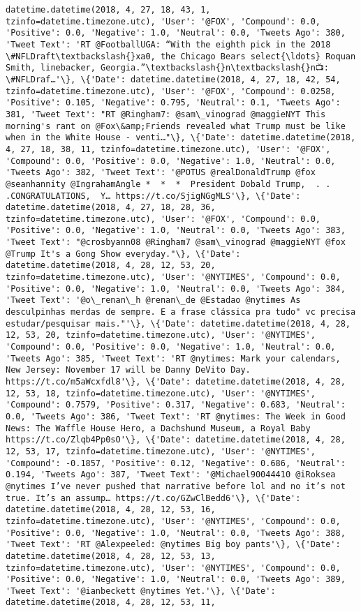 \documentclass[11pt]{article}
\begin{document}
\begin{Verbatim}[commandchars=\\\{\}]
datetime.datetime(2018, 4, 27, 18, 43, 1, tzinfo=datetime.timezone.utc), 'User': '@FOX', 'Compound': 0.0, 'Positive': 0.0, 'Negative': 1.0, 'Neutral': 0.0, 'Tweets Ago': 380, 'Tweet Text': 'RT @FootballUGA: “With the eighth pick in the 2018 \#NFLDraft\textbackslash{}xa0, the Chicago Bears select{\ldots} Roquan Smith, linebacker, Georgia.”\textbackslash{}n\textbackslash{}n📺: \#NFLDraf…'\}, \{'Date': datetime.datetime(2018, 4, 27, 18, 42, 54, tzinfo=datetime.timezone.utc), 'User': '@FOX', 'Compound': 0.0258, 'Positive': 0.105, 'Negative': 0.795, 'Neutral': 0.1, 'Tweets Ago': 381, 'Tweet Text': "RT @Ringham7: @sam\_vinograd @maggieNYT This morning's rant on @Fox\&amp;Friends revealed what Trump must be like when in the White House - venti…"\}, \{'Date': datetime.datetime(2018, 4, 27, 18, 38, 11, tzinfo=datetime.timezone.utc), 'User': '@FOX', 'Compound': 0.0, 'Positive': 0.0, 'Negative': 1.0, 'Neutral': 0.0, 'Tweets Ago': 382, 'Tweet Text': '@POTUS @realDonaldTrump @fox @seanhannity @IngrahamAngle *  *  *  President Dobald Trump,  . . .CONGRATULATIONS,  Y… https://t.co/SjigNGgMLS'\}, \{'Date': datetime.datetime(2018, 4, 27, 18, 28, 36, tzinfo=datetime.timezone.utc), 'User': '@FOX', 'Compound': 0.0, 'Positive': 0.0, 'Negative': 1.0, 'Neutral': 0.0, 'Tweets Ago': 383, 'Tweet Text': "@crosbyann08 @Ringham7 @sam\_vinograd @maggieNYT @fox @Trump It's a Gong Show everyday."\}, \{'Date': datetime.datetime(2018, 4, 28, 12, 53, 20, tzinfo=datetime.timezone.utc), 'User': '@NYTIMES', 'Compound': 0.0, 'Positive': 0.0, 'Negative': 1.0, 'Neutral': 0.0, 'Tweets Ago': 384, 'Tweet Text': '@o\_renan\_h @renan\_de @Estadao @nytimes As desculpinhas merdas de sempre. E a frase clássica pra tudo" vc precisa estudar/pesquisar mais."'\}, \{'Date': datetime.datetime(2018, 4, 28, 12, 53, 20, tzinfo=datetime.timezone.utc), 'User': '@NYTIMES', 'Compound': 0.0, 'Positive': 0.0, 'Negative': 1.0, 'Neutral': 0.0, 'Tweets Ago': 385, 'Tweet Text': 'RT @nytimes: Mark your calendars, New Jersey: November 17 will be Danny DeVito Day. https://t.co/m5aWcxfdl8'\}, \{'Date': datetime.datetime(2018, 4, 28, 12, 53, 18, tzinfo=datetime.timezone.utc), 'User': '@NYTIMES', 'Compound': 0.7579, 'Positive': 0.317, 'Negative': 0.683, 'Neutral': 0.0, 'Tweets Ago': 386, 'Tweet Text': 'RT @nytimes: The Week in Good News: The Waffle House Hero, a Dachshund Museum, a Royal Baby https://t.co/Zlqb4Pp0sO'\}, \{'Date': datetime.datetime(2018, 4, 28, 12, 53, 17, tzinfo=datetime.timezone.utc), 'User': '@NYTIMES', 'Compound': -0.1857, 'Positive': 0.12, 'Negative': 0.686, 'Neutral': 0.194, 'Tweets Ago': 387, 'Tweet Text': '@Michael90044410 @iRoksea @nytimes I’ve never pushed that narrative before lol and no it’s not true. It’s an assump… https://t.co/GZwClBedd6'\}, \{'Date': datetime.datetime(2018, 4, 28, 12, 53, 16, tzinfo=datetime.timezone.utc), 'User': '@NYTIMES', 'Compound': 0.0, 'Positive': 0.0, 'Negative': 1.0, 'Neutral': 0.0, 'Tweets Ago': 388, 'Tweet Text': 'RT @Alexpeeled: @nytimes Big boy pants'\}, \{'Date': datetime.datetime(2018, 4, 28, 12, 53, 13, tzinfo=datetime.timezone.utc), 'User': '@NYTIMES', 'Compound': 0.0, 'Positive': 0.0, 'Negative': 1.0, 'Neutral': 0.0, 'Tweets Ago': 389, 'Tweet Text': '@ianbeckett @nytimes Yet.'\}, \{'Date': datetime.datetime(2018, 4, 28, 12, 53, 11, 
\end{Verbatim}
\end{document}
